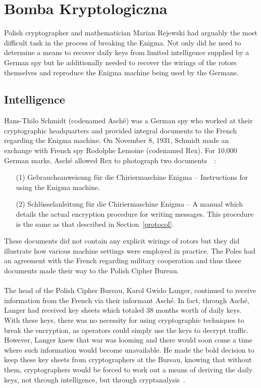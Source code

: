 \chapter{Bomba Kryptologiczna}

Polish cryptographer and mathematician Marian Rejewski had arguably the most difficult task in the process of breaking the Enigma. Not only did he need to determine a means to
recover daily keys from limited intelligence supplied by a German spy but he
additionally needed to recover the wirings of the rotors themselves
and reproduce the Enigma machine being used by the Germans.

\section{Intelligence}

Hans-Thilo Schmidt (codenamed Asché) was a German spy who worked at
their cryptographic headquarters and provided integral documents to
the French regarding the Enigma machine. On November 8, 1931, Schmidt
made an exchange with French spy Rodolphe Lemoine (codenamed Rex).
For 10,000 German marks,  Asché allowed Rex to photograph two documents~\cite[pp.~16--21]{KozaczukEnigma1984}~\cite[pp.~144--146]{SinghCodeBook1999}:
\begin{itemize}
  \item[(1)] Gebrauchsanweisung für die Chiriermaschine
    Enigma -- Instructions for using the Enigma machine.
  \item[(2)] Schlüsselanleitung für die Chiriermaschine Enigma -- A manual
    which details the actual encryption procedure for writing
    messages. This procedure is the same as that described in
    Section~\ref{protocol}.
\end{itemize}
These documents did not contain any explicit wirings of rotors but
they did illustrate how various machine settings were employed in
practice. The Poles had an agreement with the French regarding
military cooperation and thus these documents made their way to the
Polish Cipher Bureau.
\\\\The head of the Polish Cipher Bureau, Karol Gwido Langer,
continued to receive information from the French via their informant
Asché. In fact, through Asché, Langer had received key sheets which
totaled 38 months worth of daily keys. With these keys, there was no
necessity for using cryptographic techniques to break the encryption,
as operators could simply use the keys to decrypt traffic. However,
Langer knew that war was looming and there would soon come a time where
such information would become unavailable. He made the bold decision
to keep these key sheets from cryptographers at the Bureau, knowing
that without them, cryptographers would be forced to work out a means
of deriving the daily keys, not through intelligence, but through cryptanalysis~\cite[p.~157]{SinghCodeBook1999}.
